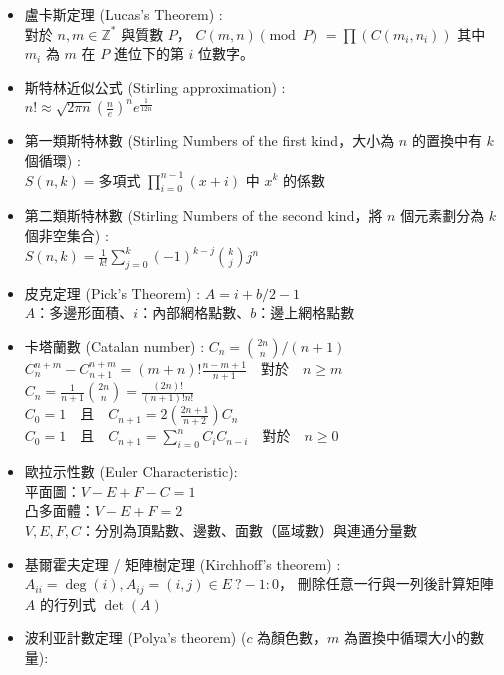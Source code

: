 \begin{itemize}
    \item 盧卡斯定理 (Lucas's Theorem) :\\
      對於 $n, m \in \mathbb{Z}^{*}$ 與質數 $P$，
      $C(m,n) \pmod P$
        $= \prod ( C(m_i,n_i) )$
      其中 $m_i$ 為 $m$ 在 $P$ 進位下的第 $i$ 位數字。
    \item 斯特林近似公式 (Stirling approximation) : \\
      $n!\approx\sqrt{ 2 \pi n}(\frac{n}{e})^{n}e^\frac{1}{12n}$
    \item 第一類斯特林數 (Stirling Numbers of the first kind，大小為 $n$ 的置換中有 $k$ 個循環) : \\
      $S(n,k) = \text{多項式 } \prod_{i=0}^{n-1} (x+i) \text{ 中 } x^k \text{ 的係數}$
    \item 第二類斯特林數 (Stirling Numbers of the second kind，將 $n$ 個元素劃分為 $k$ 個非空集合) : \\
      $S(n,k) = \frac{1}{k!} \sum\limits_{j=0}^k (-1)^{k-j} {k \choose j} j^n$
    \item 皮克定理 (Pick's Theorem) : $A = i + b/2 - 1$\\
      $A$：多邊形面積、$i$：內部網格點數、$b$：邊上網格點數
    \item 卡塔蘭數 (Catalan number) : $C_n = {2n \choose n}/(n+1)$\\
      $C^{n+m}_{n}-C^{n+m}_{n+1} = (m+n)! \frac{n-m+1}{n+1}\quad \text{對於} \quad n \ge m$\\
      $C_n = \frac{1}{n+1}{2n \choose n} = \frac{(2n)!}{(n+1)!n!}$\\
      $C_0 = 1 \quad \text{且} \quad C_{n+1}= 2(\frac{2n+1}{n+2})C_n$\\
      $C_0 = 1 \quad \text{且} \quad C_{n+1} = \sum_{i=0}^{n} C_iC_{n-i} \quad \text{對於} \quad n \ge 0$
    \item 歐拉示性數 (Euler Characteristic): \\
      平面圖：$V-E+F-C=1$ \\
      凸多面體：$V-E+F=2$ \\
      $V,E,F,C$：分別為頂點數、邊數、面數（區域數）與連通分量數
    \item 基爾霍夫定理 / 矩陣樹定理 (Kirchhoff's theorem) : \\
      $A_{ii} = \deg(i), A_{ij} = (i,j) \in E\ ? -1 : 0$，
      刪除任意一行與一列後計算矩陣 $A$ 的行列式 $\det(A)$
    \item 波利亚計數定理 (Polya's theorem) ($c$ 為顏色數，$m$ 為置換中循環大小的數量): \\

\end{itemize}
